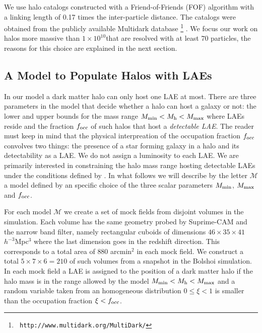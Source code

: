 \documentclass[usenatbib]{mn2e}
\newcommand{\hMsun}{{\ifmmode{h^{-1}{\rm
        {M_{\odot}}}}\else{$h^{-1}{\rm{M_{\odot}}}$}\fi}}
\begin{document}
We use halo catalogs constructed with a Friend-of-Friends (FOF)
algorithm with a linking length of 0.17 times the inter-particle
distance. The catalogs were obtained from the publicly available
Multidark database \footnote{{\tt
    http://www.multidark.org/MultiDark/}}
\citep{2011arXiv1109.0003R}. We focus our work on halos more massive
than $1\times 10^{10}$\hMsun that are resolved with at least $70$
particles, the reasons for this choice are explained in the next
section. 


\subsection{A Model to Populate Halos with LAEs}
\label{subsec:mocks}

In our model a dark matter halo can only host one LAE at most. 
There are three parameters in the model that decide whether a halo can host a
galaxy or not: the lower and upper bounds for the mass range $M_{\rm min}<
M_{\rm h} < M_{\rm max}$ where LAEs reside and the fraction $f_{\rm
  occ}$ of such halos that host a \emph{detectable LAE}. The reader
must keep in mind that the physical interpreation of the occupation
fraction $f_{\rm occ}$ convolves two things: the presence of a star
forming galaxy in a halo and its detectability as a LAE. We do not assign a
luminosity to each LAE. We are primarily interested in
constraining the halo mass range hosting detectable LAEs under the
conditions defined by \cite{Yamada2012}. In what follows we will describe by
the letter ${\mathcal M}$ a model defined by an specific choice of the
three scalar parameters $M_{\rm min}$, $M_{\rm  max}$ and $f_{\rm occ}$.  


For each model ${\mathcal M}$ we create a set of mock fields from
disjoint volumes in the simulation. Each volume has the same geometry
probed by Suprime-CAM and the narrow band filter, namely rectangular
cuboids of dimensions $46\times 35\times 41$ $h^{-3}$Mpc$^{3}$ where
the last dimension goes in the redshift direction. This corresponds to
a total area of $880$ arcmin$^{2}$ in each mock field. We construct a total
$5\times 7 \times 6=210$ of such volumes from a snapshot in the Bolshoi
simulation. In each mock field a LAE is assigned to the position of a
dark matter halo if the halo mass is in the range allowed by the model
$M_{\rm min}<M_{\rm h}<M_{\rm max}$ and a random variable taken from
an homogeneous distribution $0\leq \xi<1$ is smaller than the occupation
fraction $\xi<f_{\rm occ}$.
\end{document}
